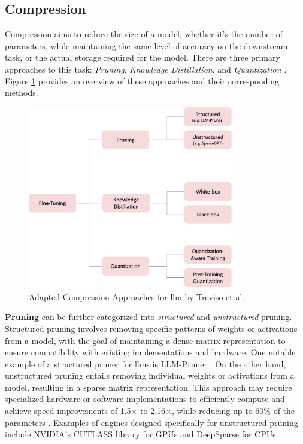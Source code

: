 \subsection{Compression}
\label{subsec:llm_compression}

Compression aims to reduce the size of a model, whether it's the number of parameters, while maintaining the same level of accuracy on the downstream task, or the actual storage required for the model. There are three primary approaches to this task: \textit{Pruning}, \textit{Knowledge Distillation}, and \textit{Quantization} \cite{treviso_efficient_2023, zhu_survey_2023}. Figure \ref{fig:llm_compression} provides an overview of these approaches and their corresponding methods.

\begin{figure}
    \centering
    \includegraphics[width=0.8\textwidth]{Grafiken/compression_approaches.png}
    \caption{Adapted Compression Approaches for \gls{llm} by Treviso et al. \cite{treviso_efficient_2023}}
    \label{fig:llm_compression}
\end{figure}

\textbf{Pruning} can be further categorized into \textit{structured} and \textit{unstructured} pruning. Structured pruning involves removing specific patterns of weights or activations from a model, with the goal of maintaining a dense matrix representation to ensure compatibility with existing implementations and hardware. One notable example of a structured pruner for \gls{llm}s is LLM-Pruner \cite{ma_llm-pruner_2023}. On the other hand, unstructured pruning entails removing individual weights or activations from a model, resulting in a sparse matrix representation. This approach may require specialized hardware or software implementations to efficiently compute and achieve speed improvements of 1.5$\times$ to 2.16$\times$, while reducing up to 60\% of the parameters \cite{frantar_sparsegpt_2023}. Examples of engines designed specifically for unstructured pruning include NVIDIA's CUTLASS library for GPUs \cite{frantar_sparsegpt_2023} and DeepSparse \cite{noauthor_deepsparse_2023} for CPUs.


